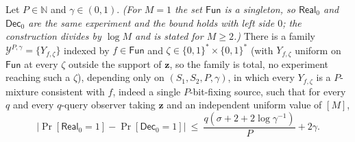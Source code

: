 \documentclass{aicr-solution}
\newcommand{\Fun}{\mathsf{Fun}}
\newcommand{\Real}{\mathsf{Real}}
\newcommand{\Dec}{\mathsf{Dec}}
\newcommand{\Prob}[1]{\Pr\!\left[#1\right]}
\newcommand{\bits}{\{0,1\}}
\newcommand{\vz}{\mathbf{z}}
\begin{document}
\begin{lemma}\label{lem:P}
Let $P\in\mathbb N$ and $\gamma\in(0,1)$. \emph{(For $M=1$ the set $\Fun$ is a singleton,
so $\Real_0$ and $\Dec_0$ are the same experiment and the bound holds with left
side $0$; the construction divides by $\log M$ and is stated for $M\ge2$.)} There
is a family $\mathcal Y^{P,\gamma}=\{Y_{f,\zeta}\}$ indexed by $f\in\Fun$ and
$\zeta\in\bits^{*}\times\bits^{*}$ (with $Y_{f,\zeta}$ uniform on $\Fun$ at
every $\zeta$ outside the support of $\vz$, so the family is total, no experiment
reaching such a $\zeta$), depending only on $(S_1,S_2,P,\gamma)$, in which every
$Y_{f,\zeta}$ is a $P$-mixture consistent with $f$, indeed a single
$P$-bit-fixing source, such that for every $q$ and every $q$-query observer
taking $\vz$ and an independent uniform value of $[M]$,
\[
  \bigl|\Prob{\Real_0=1}-\Prob{\Dec_0=1}\bigr|\ \le\
  \frac{q(\sigma+2+2\log\gamma^{-1})}{P}+2\gamma .
\]
\end{lemma}
\end{document}
